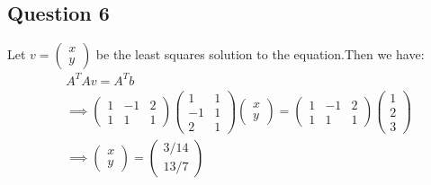 \documentclass[12pt]{article}
\begin{document}
\subsection{Question 6}
Let $v=\begin{pmatrix}x\\y\end{pmatrix}$ be the least squares solution to the equation.Then we have:\begin{align*}
    & A^TAv = A^Tb\\
    &\implies\begin{pmatrix}1&-1&2\\1&1&1\end{pmatrix}\begin{pmatrix}1&1\\-1&1\\2&1\end{pmatrix}\begin{pmatrix}x\\y\end{pmatrix}=\begin{pmatrix}1&-1&2\\1&1&1\end{pmatrix}\begin{pmatrix}1\\2\\3\end{pmatrix}\\
    &\implies\begin{pmatrix}x\\y\end{pmatrix}=\begin{pmatrix}3/14\\13/7\end{pmatrix}
\end{align*}
\end{document}
